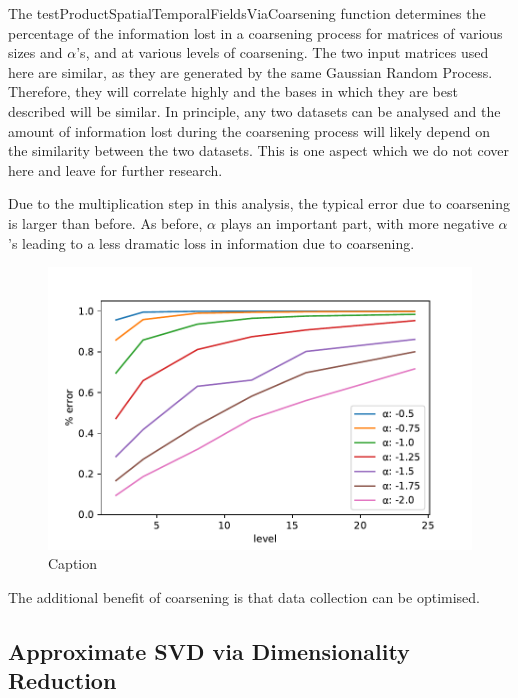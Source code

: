 \documentclass{acm_proc_article-sp}
\begin{document}
The testProductSpatialTemporalFieldsViaCoarsening function determines the percentage of the information lost in a coarsening process for matrices of various sizes and $\alpha$'s, and at various levels of coarsening. The two input matrices used here are similar, as they are generated by the same Gaussian Random Process. Therefore, they will correlate highly and the bases in which they are best described will be similar. In principle, any two datasets can be analysed and the amount of information lost during the coarsening process will likely depend on the similarity between the two datasets. This is one aspect which we do not cover here and leave for further research.

Due to the multiplication step in this analysis, the typical error due to coarsening is larger than before. As before, $\alpha$ plays an important part, with more negative $\alpha$'s leading to a less dramatic loss in information due to coarsening.

\begin{figure}[h]
\begin{center}
\includegraphics[scale=0.5]{Results/plotProductSpatialTemporalFieldsViaCoarsening.pdf}
\caption[Small caption]{Caption}
\label{fig:plotProductSpatialTemporalFieldsViaCoarsening}
\end{center}
\end{figure}

The additional benefit of coarsening is that data collection can be optimised.

\subsection{Approximate SVD via Dimensionality Reduction}
\label{sec:Techniques Approximate SVD via Dimensionality Reduction}
\end{document}
